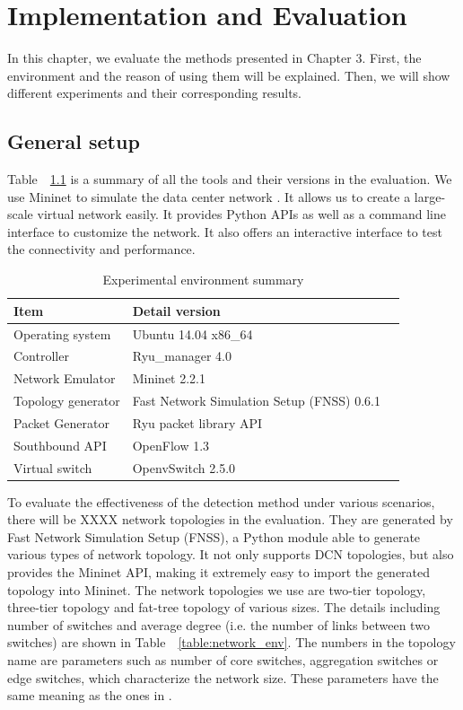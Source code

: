 \chapter{Implementation and Evaluation}
\label{Implementation_and_Evaluation}
In this chapter, we evaluate the methods presented in Chapter 3. First, the environment and the reason of using them will be explained. Then, we will show different experiments and their corresponding results.

\section{General setup}
Table~~\ref{table:Experiment_table} is a summary of all the tools and their versions in the evaluation. We use Mininet to simulate the data center network \cite{Mininet}. It allows us to create a large-scale virtual network easily. It provides Python APIs as well as a command line interface to customize the network. It also offers an interactive interface to test the connectivity and performance.

\begin{table}[H]
\centering
\caption{Experimental environment summary}
\begin{tabular}{|l|p{4cm}|p{4.5cm}}
\hline Item & Detail version \\
\hline
\hline Operating system & Ubuntu 14.04 x86\_64 \\
\hline Controller & Ryu\_manager 4.0 \\
\hline Network Emulator & Mininet 2.2.1 \\
\hline Topology generator & Fast Network Simulation Setup (FNSS) 0.6.1\\
\hline Packet Generator & Ryu packet library API \\
\hline Southbound API & OpenFlow 1.3 \\
\hline Virtual switch & OpenvSwitch 2.5.0 \\
\hline 
\end{tabular}
\label{table:Experiment_table}
\end{table}

To evaluate the effectiveness of the detection method under various scenarios, there will be XXXX network topologies in the evaluation. They are generated by Fast Network Simulation Setup (FNSS), a Python module able to generate various types of network topology. It not only supports DCN topologies, but also provides the Mininet API, making it extremely easy to import the generated topology into Mininet. The network topologies we use are two-tier topology, three-tier topology and fat-tree topology of various sizes. The details including number of switches and average degree (i.e. the number of links between two switches) are shown in Table~~\ref{table:network_env}. The numbers in the topology name are parameters such as number of core switches, aggregation switches or edge switches, which characterize the network size. These parameters have the same meaning as the ones in \cite{FNSS}.

